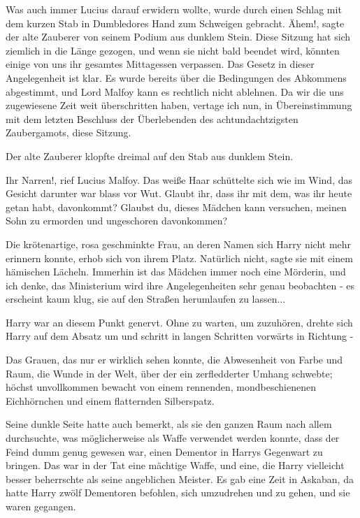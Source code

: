 Was auch immer Lucius darauf erwidern wollte, wurde durch einen Schlag mit dem
kurzen Stab in Dumbledores Hand zum Schweigen gebracht. \glqq Ähem!\grqq{},
sagte der alte Zauberer von seinem Podium aus dunklem Stein. \glqq Diese Sitzung
hat sich ziemlich in die Länge gezogen, und wenn sie nicht bald beendet wird,
könnten einige von uns ihr gesamtes Mittagessen verpassen. Das Gesetz in dieser
Angelegenheit ist klar. Es wurde bereits über die Bedingungen des Abkommens
abgestimmt, und Lord Malfoy kann es rechtlich nicht ablehnen. Da wir die uns
zugewiesene Zeit weit überschritten haben, vertage ich nun, in Übereinstimmung
mit dem letzten Beschluss der Überlebenden des achtundachtzigsten Zaubergamots,
diese Sitzung.\grqq{}

Der alte Zauberer klopfte dreimal auf den Stab aus dunklem Stein.

\glqq Ihr Narren!\grqq{}, rief Lucius Malfoy. Das weiße Haar schüttelte sich wie
im Wind, das Gesicht darunter war blass vor Wut. \glqq Glaubt ihr, dass ihr mit
dem, was ihr heute getan habt, davonkommt? Glaubst du, dieses Mädchen kann
versuchen, meinen Sohn zu ermorden und ungeschoren davonkommen?\grqq{}

Die krötenartige, rosa geschminkte Frau, an deren Namen sich Harry nicht mehr
erinnern konnte, erhob sich von ihrem Platz. \glqq Natürlich nicht\grqq{}, sagte
sie mit einem hämischen Lächeln. \glqq Immerhin ist das Mädchen immer noch eine
Mörderin, und ich denke, das Ministerium wird ihre Angelegenheiten sehr genau
beobachten - es erscheint kaum klug, sie auf den Straßen herumlaufen zu
lassen...\grqq{}

Harry war an diesem Punkt genervt. Ohne zu warten, um zuzuhören, drehte sich
Harry auf dem Absatz um und schritt in langen Schritten vorwärts in Richtung -

Das Grauen, das nur er wirklich sehen konnte, die Abwesenheit von Farbe und
Raum, die Wunde in der Welt, über der ein zerfledderter Umhang schwebte; höchst
unvollkommen bewacht von einem rennenden, mondbeschienenen Eichhörnchen und
einem flatternden Silberspatz.

Seine dunkle Seite hatte auch bemerkt, als sie den ganzen Raum nach allem
durchsuchte, was möglicherweise als Waffe verwendet werden konnte, dass der
Feind dumm genug gewesen war, einen Dementor in Harrys Gegenwart zu bringen. Das
war in der Tat eine mächtige Waffe, und eine, die Harry vielleicht besser
beherrschte als seine angeblichen Meister. Es gab eine Zeit in Askaban, da hatte
Harry zwölf Dementoren befohlen, sich umzudrehen und zu gehen, und sie waren
gegangen.

